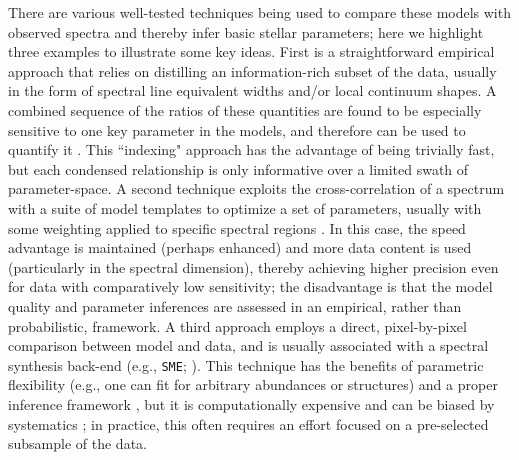 \documentclass[iop,floatfix,twocolappendix]{emulateapj}
\begin{document}
There are various well-tested techniques being used to compare these models with observed spectra 
and thereby infer basic stellar parameters; here we highlight three examples to illustrate some key 
ideas.  First is a straightforward empirical approach that relies on distilling an information-rich 
subset of the data, usually in the form of spectral line equivalent widths and/or local continuum 
shapes.  A combined sequence of the ratios of these quantities are found to be especially sensitive 
to one key parameter in the models, and therefore can be used to quantify it \citep[e.g., {\tt 
MOOG};][]{sneden73,gray94,reid95,rojas-ayala10,rojas-ayala12}.  This ``indexing" approach has the 
advantage of being trivially fast, but each condensed relationship is only informative over a 
limited swath of parameter-space.  A second technique exploits the cross-correlation of a spectrum 
with a suite of model templates to optimize a set of parameters, usually with some weighting 
applied to specific spectral regions \citep[e.g., {\tt SPC};][]{buchhave12}.  In this case, the 
speed advantage is maintained (perhaps enhanced) and more data content is used (particularly in the 
spectral dimension), thereby achieving higher precision even for data with comparatively low 
sensitivity; the disadvantage is that the model quality and parameter inferences are assessed in an 
empirical, rather than probabilistic, framework.  A third approach employs a direct, pixel-by-pixel 
comparison between model and data, and is usually associated with a spectral synthesis back-end 
(e.g., {\tt SME}; \citealt{valenti96}).  This technique has the benefits of parametric flexibility 
(e.g., one can fit for arbitrary abundances or structures) and a proper inference framework 
\citep[usually a least-squares approach, although increasingly in a Bayesian format;][]{shkedy07,
schoenrich13}, but it is computationally expensive and can be biased by systematics 
\citep[e.g.,][]{mann13}; in practice, this often requires an effort focused on a pre-selected 
subsample of the data. 
\end{document}
